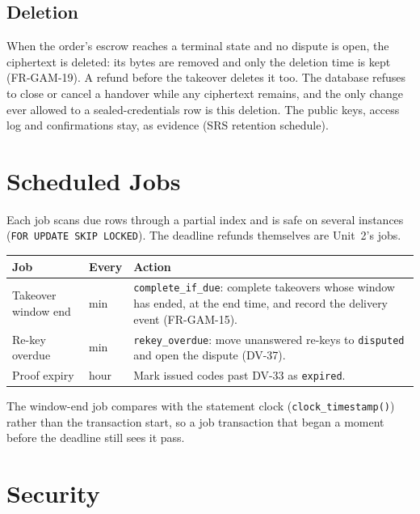 \documentclass[11pt,a4paper]{article}
\newenvironment{dtable}[1]{\small\begin{longtable}{#1}}{\end{longtable}}
\begin{document}
\subsection{Deletion}
When the order's escrow reaches a terminal state and no dispute is open, the ciphertext is deleted: its bytes are removed and only the deletion time is kept (FR-GAM-19). A refund before the takeover deletes it too. The database refuses to close or cancel a handover while any ciphertext remains, and the only change ever allowed to a sealed-credentials row is this deletion. The public keys, access log and confirmations stay, as evidence (SRS retention schedule).
\section{Scheduled Jobs}
\label{sec:jobs}
Each job scans due rows through a partial index and is safe on several instances (\texttt{FOR UPDATE SKIP LOCKED}). The deadline refunds themselves are Unit~2's jobs.
\begin{dtable}{@{}>{\raggedright\arraybackslash}p{3.6cm}>{\raggedright\arraybackslash}p{1.8cm}>{\raggedright\arraybackslash}p{9.8cm}@{}}
\toprule
\textbf{Job} & \textbf{Every} & \textbf{Action} \\ \midrule \endhead
Takeover window end & 1 min & \texttt{complete\_if\_due}: complete takeovers whose window has ended, at the end time, and record the delivery event (FR-GAM-15). \\
Re-key overdue & 5 min & \texttt{rekey\_overdue}: move unanswered re-keys to \texttt{disputed} and open the dispute (DV-37). \\
Proof expiry & 1 hour & Mark issued codes past DV-33 as \texttt{expired}. \\
\bottomrule
\end{dtable}
The window-end job compares with the statement clock (\texttt{clock\_timestamp()}) rather than the transaction start, so a job transaction that began a moment before the deadline still sees it pass.

\section{Security}
\end{document}
